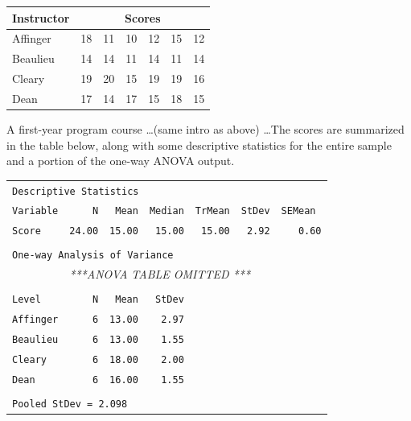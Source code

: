\documentclass[twoside,openany]{tufte-book}
\begin{document}
\begin{table}[!ht]
\begin{center}
\begin{tabular}{lllllll}
\textbf{Instructor} & \multicolumn{6}{c}{\textbf{Scores}}\\
  \hline
Affinger & 18 & 11 & 10 & 12 & 15 & 12\\
Beaulieu & 14 & 14 & 11 & 14 & 11 & 14\\
Cleary & 19 & 20 & 15 & 19 & 19 & 16\\
Dean & 17 & 14 & 17 & 15 & 18 & 15\\
\hline
\end{tabular}
\end{center}
\end{table}



A first-year program course \ldots  (same intro as above) \ldots   The scores are summarized in the table below, along with some descriptive statistics for the entire sample and a portion of the one-way ANOVA output.




\begin{table}[ht]
\begin{center}
\begin{tabular}{lrrrrrr}

\multicolumn{7}{l}{\texttt{Descriptive Statistics}}\\
\texttt{Variable} & \texttt{N} & \texttt{Mean} & \texttt{Median} & \texttt{TrMean} & \texttt{StDev}  & \texttt{SEMean}\ \\ 

\texttt{Score} & \texttt{24.00} & \texttt{15.00} & \texttt{15.00} & \texttt{15.00} & \texttt{2.92}  & \texttt{0.60} \\ 
\\
\multicolumn{7}{l}{\texttt{One-way Analysis of Variance}}\\
& \multicolumn{6}{l}{\textit{***ANOVA TABLE OMITTED ***}}
\\
\\

\texttt{Level} & \texttt{N} & \texttt{Mean} & \texttt{StDev} & & &\\ 

\texttt{Affinger} & \texttt{6} & \texttt{13.00} & \texttt{2.97} & & & \\ 
\texttt{Beaulieu} & \texttt{6} & \texttt{13.00} & \texttt{1.55} & & & \\ 
 \texttt{Cleary} & \texttt{6} & \texttt{18.00} & \texttt{2.00} & & & \\ 
\texttt{Dean} & \texttt{6} & \texttt{16.00} & \texttt{1.55} & & & \\ 
  \\
\multicolumn{7}{l}{\texttt{Pooled StDev = 2.098}}\\


\end{tabular}
\end{center}
\end{table}
\end{document}
